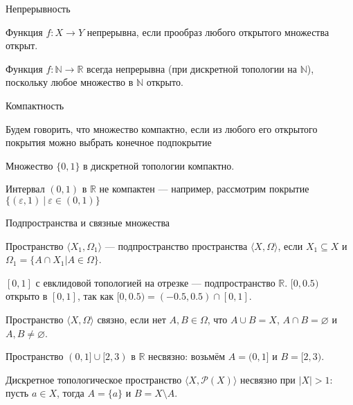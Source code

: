 \documentclass[aspectratio=169]{beamer}
\begin{document}
\begin{frame}{Непрерывность}
\begin{defrus}
Функция $f: X \rightarrow Y$ непрерывна, если прообраз любого открытого множества открыт.
\end{defrus}

\begin{exmprus}
Функция $f: \mathbb{N} \rightarrow \mathbb{R}$ всегда непрерывна (при дискретной топологии на $\mathbb{N}$), 
поскольку любое множество в $\mathbb{N}$ открыто.
\end{exmprus}
\end{frame}

\begin{frame}{Компактность}
\begin{defrus}Будем говорить, что множество компактно, если из любого его открытого покрытия можно выбрать конечное
подпокрытие
\end{defrus}

\begin{exmprus}
Множество $\{0,1\}$ в дискретной топологии компактно.
\end{exmprus}

\begin{exmprus}
Интервал $(0,1)$ в $\mathbb{R}$ не компактен --- например, рассмотрим покрытие $\{(\varepsilon,1)\ |\ \varepsilon\in(0,1)\}$ 
\end{exmprus}
\end{frame}

\begin{frame}{Подпространства и связные множества}
\begin{defrus}Пространство $\langle X_1, \Omega_1\rangle$ --- подпространство пространства $\langle X, \Omega\rangle$,
если $X_1 \subseteq X$ и $\Omega_1 = \{ A\cap X_1 | A \in \Omega\}$.
\end{defrus}
\begin{exmprus} $[0,1]$ с евклидовой топологией на отрезке --- подпространство $\mathbb{R}$.
$[0,0.5)$ открыто в $[0,1]$, так как $[0,0.5) = (-0.5,0.5) \cap [0,1]$.\end{exmprus}

\begin{defrus}Пространство $\langle X, \Omega\rangle$ связно, если нет $A,B \in \Omega$, что $A\cup B = X$,
$A \cap B = \varnothing$ и $A,B \ne \varnothing$.\end{defrus}

\begin{exmprus}Пространство $(0,1]\cup[2,3)$ в $\mathbb{R}$ несвязно: возьмём $A=(0,1]$ и $B = [2,3)$.

Дискретное топологическое пространство $\langle X, \mathcal{P}(X)\rangle$ несвязно при $|X| > 1$: пусть $a \in X$, 
тогда $A = \{a\}$ и $B = X \setminus A$.
\end{exmprus}
\end{frame}
\end{document}
